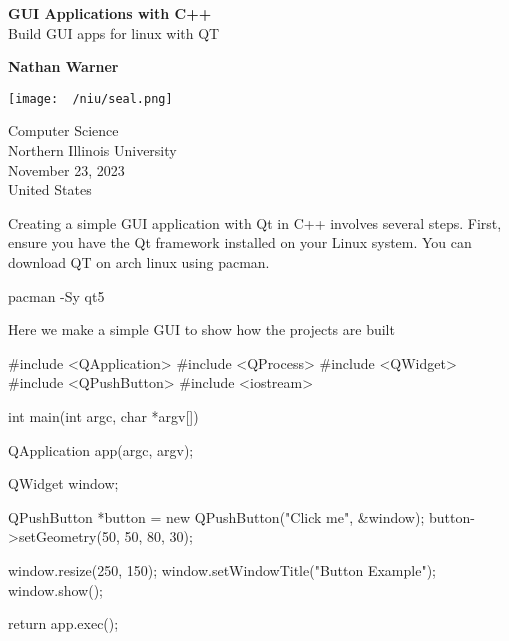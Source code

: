 \documentclass{report}
\title{\Huge{}}
\author{\huge{Nathan Warner}}
\date{\huge{}}
\begin{document}
        \begin{titlepage}
       \begin{center}
           \vspace*{1cm}
    
           \textbf{GUI Applications with C++} \\
           Build GUI apps for linux with QT
    
           \vspace{0.5cm}
            
                
           \vspace{1.5cm}
    
           \textbf{Nathan Warner}
    
           \vfill
                
                
           \vspace{0.8cm}
         
           \texttt{[image: ~/niu/seal.png]}
                
           Computer Science \\
           Northern Illinois University\\
           November 23, 2023\\
           United States\\
           
                
       \end{center}
    \end{titlepage}
    \tableofcontents
    \pagebreak
    \bigbreak \noindent 
    Creating a simple GUI application with Qt in C++ involves several steps. First, ensure you have the Qt framework installed on your Linux system. You can download QT on arch linux using pacman.
    \bigbreak \noindent 
    \begin{bashcode}
pacman -Sy qt5
    \end{bashcode}

    \pagebreak
    \bigbreak \noindent 
    Here we make a simple GUI to show how the projects are built
    \bigbreak \noindent 
    \begin{cppcode}
#include <QApplication>
#include <QProcess>
#include <QWidget>
#include <QPushButton>
#include <iostream>

int main(int argc, char *argv[]) {
    QApplication app(argc, argv);

    QWidget window;

    QPushButton *button = new QPushButton("Click me", &window);
    button->setGeometry(50, 50, 80, 30);

    window.resize(250, 150);
    window.setWindowTitle("Button Example");
    window.show();

    return app.exec();
}
    \end{cppcode}
\end{document}
